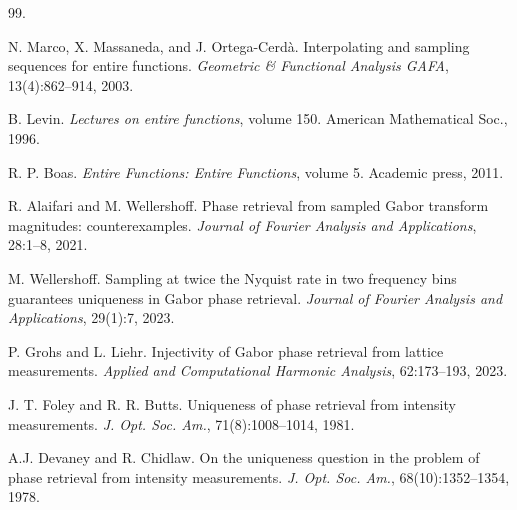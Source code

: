 \documentclass[graybox]{svmult}
\begin{document}


%
%
% 
% 
%


\begin{thebibliography}{99.}%
%
%


N. Marco, X. Massaneda, and J. Ortega-Cerd{\`a}.
\newblock Interpolating and sampling sequences for entire functions.
\newblock \emph{Geometric \& Functional Analysis GAFA}, 13(4):862--914, 2003.

B. Levin.
\newblock \emph{Lectures on entire functions}, volume 150.
\newblock American Mathematical Soc., 1996.

R. P. Boas.
\newblock \emph{Entire Functions: Entire Functions}, volume 5.
\newblock Academic press, 2011.

R. Alaifari and M. Wellershoff.
\newblock Phase retrieval from sampled {G}abor transform magnitudes:
  counterexamples.
\newblock \emph{Journal of Fourier Analysis and Applications}, 28:1--8, 2021.

M. Wellershoff.
\newblock Sampling at twice the {N}yquist rate in two frequency bins guarantees
  uniqueness in {G}abor phase retrieval.
\newblock \emph{Journal of Fourier Analysis and Applications}, 29(1):7, 2023.

P. Grohs and L. Liehr.
\newblock Injectivity of {G}abor phase retrieval from lattice measurements.
\newblock \emph{Applied and Computational Harmonic Analysis}, 62:173--193, 2023.

J. T. Foley and R. R. Butts.
\newblock Uniqueness of phase retrieval from intensity measurements.
\newblock \emph{J. Opt. Soc. Am.}, 71(8):1008--1014, 1981.

A.J. Devaney and R. Chidlaw.
\newblock On the uniqueness question in the problem of phase retrieval from
  intensity measurements.
\newblock \emph{J. Opt. Soc. Am.}, 68(10):1352--1354, 1978.


\end{thebibliography}
\end{document}
